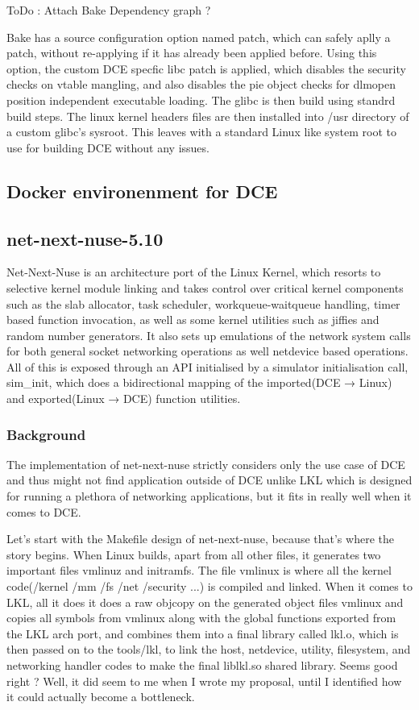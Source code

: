 \documentclass{sig-alternate}
\begin{document}
ToDo : Attach Bake Dependency graph ? 

Bake has a source configuration option named patch, which can safely aplly a patch, without re-applying if it has already been applied before.
Using this option, the custom DCE specfic libc patch is applied, which disables the security checks on vtable mangling, and also disables the 
pie object checks for dlmopen position independent executable loading. The glibc is then build using standrd build steps. The linux kernel headers
files are then installed into /usr directory of a custom glibc's sysroot. This leaves with a standard Linux like system root to use for building 
DCE without any issues. 


\subsection{Docker environenment for DCE}

\subsection{net-next-nuse-5.10}
Net-Next-Nuse is an architecture port of the Linux Kernel, which resorts to selective kernel module linking and takes control over critical kernel 
components such as the slab allocator, task scheduler, workqueue-waitqueue handling, timer based function invocation, as well as some kernel 
utilities such as jiffies and random number generators. It also sets up emulations of the network system calls for both general socket networking 
operations as well netdevice based operations. All of this is exposed through an API initialised by a simulator initialisation call, sim\_init, 
which does a bidirectional mapping of the imported(DCE → Linux) and exported(Linux → DCE) function utilities.

\subsubsection{Background}
The implementation of net-next-nuse strictly considers only the use case of DCE and thus might not find application outside of DCE unlike LKL which
is designed for running a plethora of networking applications, but it fits in really well when it comes to DCE. 

Let's start with the Makefile design of net-next-nuse, because that's where the story begins. When Linux builds, apart from all other files, it generates 
two important files vmlinuz and initramfs. The file vmlinux is where all the kernel code(/kernel /mm /fs /net /security ...) is compiled and 
linked. When it comes to LKL, all it does it does a raw objcopy on the generated object files vmlinux and copies all symbols from vmlinux along 
with the global functions exported from the LKL arch port, and combines them into a final library called lkl.o, which is then passed on to the 
tools/lkl, to link the host, netdevice, utility, filesystem, and networking handler codes to make the final liblkl.so shared library. 
Seems good right ? Well, it did seem to me when I wrote my proposal, until I identified how it could actually become a bottleneck. 
\end{document}
